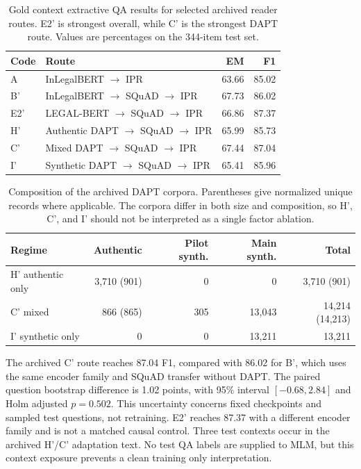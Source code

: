 \documentclass[pdflatex,sn-basic]{sn-jnl}
\begin{document}
\begin{table}[!htbp]
\caption{Gold context extractive QA results for selected archived reader
routes. E2' is strongest overall, while C' is the strongest DAPT route.
Values are percentages on the 344-item test set.}
\label{tab:reader_results}
\centering
\begin{tabular}{@{}llrr@{}}
\toprule
Code & Route & EM & F1 \\
\midrule
A & InLegalBERT \(\rightarrow\) IPR & 63.66 & 85.02 \\
B' & InLegalBERT \(\rightarrow\) SQuAD \(\rightarrow\) IPR & 67.73 & 86.02 \\
E2' & LEGAL-BERT \(\rightarrow\) SQuAD \(\rightarrow\) IPR & 66.86 & 87.37 \\
H' & Authentic DAPT \(\rightarrow\) SQuAD \(\rightarrow\) IPR & 65.99 & 85.73 \\
C' & Mixed DAPT \(\rightarrow\) SQuAD \(\rightarrow\) IPR & 67.44 & 87.04 \\
I' & Synthetic DAPT \(\rightarrow\) SQuAD \(\rightarrow\) IPR & 65.41 & 85.96 \\
\bottomrule
\end{tabular}
\end{table}

\begin{table}[!htbp]
\caption{Composition of the archived DAPT corpora. Parentheses give normalized
unique records where applicable. The corpora differ in both size and
composition, so H', C', and I' should not be interpreted as a
single factor ablation.}
\label{tab:corpus_manifest}
\centering
\begin{tabular}{@{}lrrrr@{}}
\toprule
Regime & Authentic & Pilot synth. & Main synth. & Total \\
\midrule
H' authentic only & 3,710 (901) & 0 & 0 & 3,710 (901) \\
C' mixed & 866 (865) & 305 & 13,043 & 14,214 (14,213) \\
I' synthetic only & 0 & 0 & 13,211 & 13,211 \\
\bottomrule
\end{tabular}
\end{table}

The archived C' route reaches 87.04 F1, compared with 86.02 for B', which
uses the same encoder family and SQuAD transfer without DAPT.
The paired question bootstrap difference is 1.02 points, with 95\% interval
\([-0.68,2.84]\) and Holm adjusted \(p=0.502\).
This uncertainty concerns fixed checkpoints and sampled test questions,
not retraining. E2' reaches 87.37 with a different encoder family and is
not a matched causal control. Three test contexts occur in the archived
H'/C' adaptation text. No test QA labels are supplied to MLM, but this
context exposure prevents a clean training only interpretation.
\end{document}
